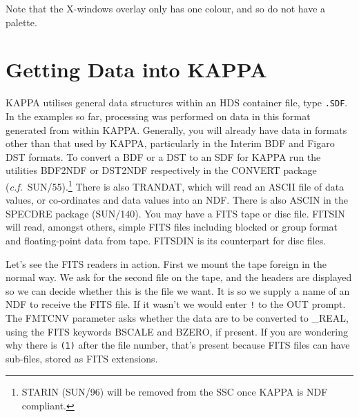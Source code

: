 {Note that the X-windows overlay only has one colour, and so do not have
a palette.

\section{Getting Data into KAPPA}
{\small KAPPA} utilises general data structures within an HDS container
file, type {\tt .SDF}. In the examples so far, processing was performed
on data in this format generated from within {\small KAPPA}. Generally,
you will already have data in formats other than that used by {\small
KAPPA}, particularly in the Interim BDF and Figaro DST formats. To convert
a BDF or a DST to an SDF for {\small KAPPA} run the utilities {\small
BDF2NDF} or {\small DST2NDF} respectively in the {\small CONVERT}
package ({\it c.f.}~SUN/55).\footnote{STARIN (SUN/96) will be removed
from the SSC once {\small KAPPA} is NDF compliant.} There is also
TRANDAT, which will read an ASCII file of data values, or co-ordinates
and data values into an NDF.  There is also ASCIN in the {\small 
SPECDRE} package (SUN/140).  You may have a FITS tape or disc file.
FITSIN will read, amongst others, simple FITS files including blocked or
group format and floating-point data from tape.  FITSDIN is its
counterpart for disc files.

Let's see the FITS readers in action.  First we mount the tape foreign
in the normal way.  We ask for the second file on the tape, and the
headers are displayed so we can decide whether this is the file we
want.  It is so we supply a name of an NDF to receive the FITS file.
If it wasn't we would enter {\tt !} to the OUT prompt.  The FMTCNV
parameter asks whether the data are to be converted to \_REAL,
using the FITS keywords BSCALE and BZERO, if present.  If you are
wondering why there is {\tt (1)} after the file number, that's present
because FITS files can have sub-files, stored as FITS extensions.

}
